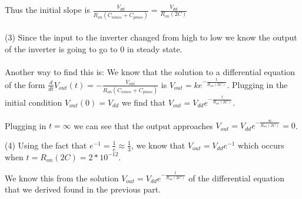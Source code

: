 \begin{enumerate}
{  Thus the initial slope is $\frac{V_{dd}}{R_{on}(C_{nmos} + C_{pmos})} = \frac{V_{dd}}{R_{on}(2C)}$
  \\
  \\
  (3) Since the input to the inverter changed from high to low we know the output of the inverter is going to go to $0$ in steady state.
  \\
  \\
  Another way to find this is: We know that the solution to a differential equation of the form $\frac{d}{dt}V_{out}(t) = - \frac{V_{out}}{R_{on}(C_{nmos} + C_{pmos})}$ is $V_{out} = ke^{-\frac{t}{R_{on}(2C)}}$.
  Plugging in the initial condition $V_{out}(0) = V_{dd}$ we find that $V_{out} = V_{dd}e^{-\frac{t}{R_{on}(2C)}}$.
  \\
  \\
  Plugging in $t = \infty$ we can see that the output approaches $V_{out} = V_{dd}e^{-\frac{\infty}{R_{on}(2C)}} = 0$.

  

  (4) Using the fact that $e^{-1} = \frac{1}{e} \approx \frac{1}{3}$, we know that $V_{out} = V_{dd}e^{-1}$ which occurs when $t = R_{on}(2C) = 2 * 10^{-12}$.

  We know this from the solution $V_{out} = V_{dd}e^{-\frac{t}{R_{on}(2C)}}$ of the differential equation that we derived found in the previous part.
}



\end{enumerate}
